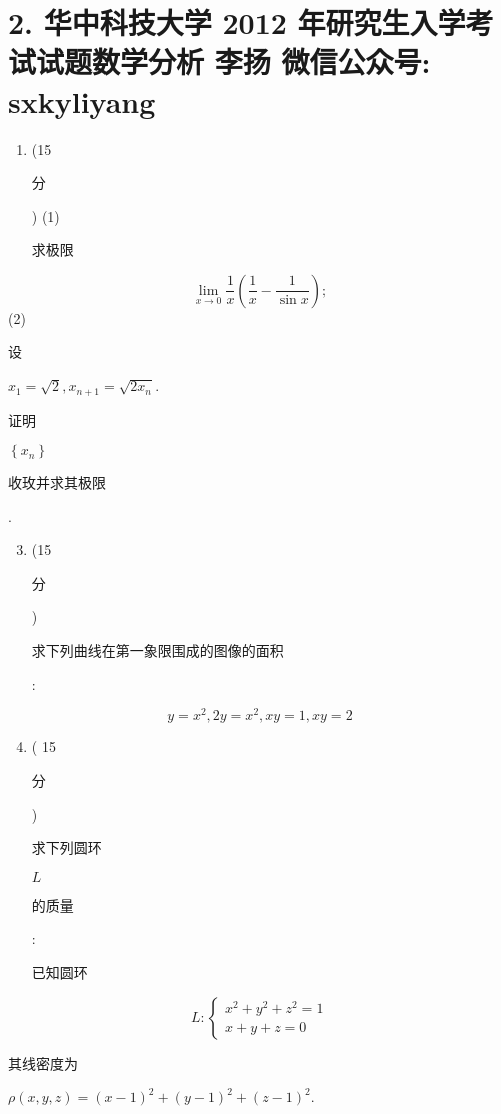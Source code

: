 \documentclass[10pt]{article}
\begin{document}
\section{2. 华中科技大学 2012 年研究生入学考试试题数学分析 
 李扬 
 微信公众号: sxkyliyang}
\begin{enumerate}
  \item (15 \begin{CJK}{UTF8}{mj}分\end{CJK}) (1) \begin{CJK}{UTF8}{mj}求极限\end{CJK}
\end{enumerate}
$$
\lim _{x \rightarrow 0} \frac{1}{x}\left(\frac{1}{x}-\frac{1}{\sin x}\right) ;
$$
(2) \begin{CJK}{UTF8}{mj}设\end{CJK} $x_{1}=\sqrt{2}, x_{n+1}=\sqrt{2 x_{n}}$. \begin{CJK}{UTF8}{mj}证明\end{CJK} $\left\{x_{n}\right\}$ \begin{CJK}{UTF8}{mj}收玫并求其极限\end{CJK}.

\begin{enumerate}
  \setcounter{enumi}{2}
  \item (15 \begin{CJK}{UTF8}{mj}分\end{CJK}) \begin{CJK}{UTF8}{mj}求下列曲线在第一象限围成的图像的面积\end{CJK}:
\end{enumerate}
$$
y=x^{2}, 2 y=x^{2}, x y=1, x y=2
$$

\begin{enumerate}
  \setcounter{enumi}{3}
  \item ( 15 \begin{CJK}{UTF8}{mj}分\end{CJK}) \begin{CJK}{UTF8}{mj}求下列圆环\end{CJK} $L$ \begin{CJK}{UTF8}{mj}的质量\end{CJK}: \begin{CJK}{UTF8}{mj}已知圆环\end{CJK}
\end{enumerate}
$$
L:\left\{\begin{array}{l}
x^{2}+y^{2}+z^{2}=1 \\
x+y+z=0
\end{array}\right.
$$
\begin{CJK}{UTF8}{mj}其线密度为\end{CJK} $\rho(x, y, z)=(x-1)^{2}+(y-1)^{2}+(z-1)^{2}$.
\end{document}
